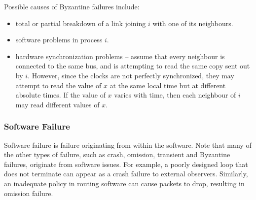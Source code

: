 Possible causes of Byzantine failures include:
\begin{itemize}
\item total or partial breakdown of a link joining $i$ with one of its neighbours.
\item software problems in process $i$.
\item hardware synchronization problems – assume that every neighbour is connected to the same bus, and is attempting to read the same copy sent out by $i$. However, since the clocks are not perfectly synchronized, they may attempt to read the value of $x$ at the same local time but at different absolute times. If the value of $x$ varies with time, then each neighbour of $i$ may read different values of $x$. 
\end{itemize}

\subsubsection{Software Failure}
Software failure is failure originating from within the software. Note that many of the other types of failure, such as crash, omission, transient and Byzantine failures, originate from software issues. For example, a poorly designed loop that does not terminate can appear as a crash failure to external observers. Similarly, an inadequate policy in routing software can cause packets to drop, resulting in omission failure.

